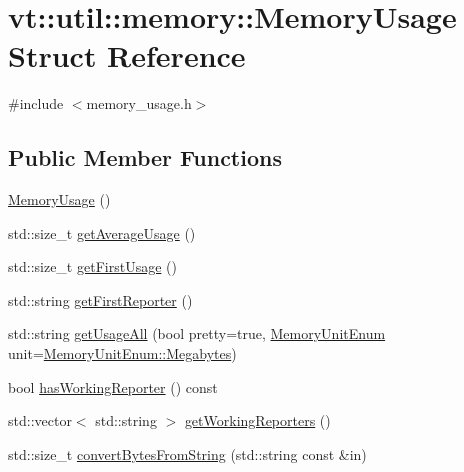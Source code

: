 \hypertarget{structvt_1_1util_1_1memory_1_1_memory_usage}{}\section{vt\+:\+:util\+:\+:memory\+:\+:Memory\+Usage Struct Reference}
\label{structvt_1_1util_1_1memory_1_1_memory_usage}


{\ttfamily \#include $<$memory\+\_\+usage.\+h$>$}

\subsection*{Public Member Functions}
\begin{DoxyCompactItemize}
\item 
\hyperlink{structvt_1_1util_1_1memory_1_1_memory_usage_a5838280c7b2b24ab8ed2aff450b5e98f}{Memory\+Usage} ()
\item 
std\+::size\+\_\+t \hyperlink{structvt_1_1util_1_1memory_1_1_memory_usage_a59d87ec931fe37d4300ba72b00e63d8e}{get\+Average\+Usage} ()
\item 
std\+::size\+\_\+t \hyperlink{structvt_1_1util_1_1memory_1_1_memory_usage_ab02282aab80eb52e5f8f43095af05304}{get\+First\+Usage} ()
\item 
std\+::string \hyperlink{structvt_1_1util_1_1memory_1_1_memory_usage_a5baf0fd6bf753755c4602fcb91a7c268}{get\+First\+Reporter} ()
\item 
std\+::string \hyperlink{structvt_1_1util_1_1memory_1_1_memory_usage_aa37f5b634fb87151fc1688cdba759298}{get\+Usage\+All} (bool pretty=true, \hyperlink{namespacevt_1_1util_1_1memory_a64df3d84293b34009f78e2a1db2f9bb6}{Memory\+Unit\+Enum} unit=\hyperlink{namespacevt_1_1util_1_1memory_a64df3d84293b34009f78e2a1db2f9bb6a2276a1b157f2813f3b65d04c0b1c56f6}{Memory\+Unit\+Enum\+::\+Megabytes})
\item 
bool \hyperlink{structvt_1_1util_1_1memory_1_1_memory_usage_aee12dfad3c08673967dd1fcd6a6adfb5}{has\+Working\+Reporter} () const
\item 
std\+::vector$<$ std\+::string $>$ \hyperlink{structvt_1_1util_1_1memory_1_1_memory_usage_a23bded824e4360e4389d9869c3bd7f18}{get\+Working\+Reporters} ()
\item 
std\+::size\+\_\+t \hyperlink{structvt_1_1util_1_1memory_1_1_memory_usage_ad047c8acc218403b53ec97c82fa7d7e3}{convert\+Bytes\+From\+String} (std\+::string const \&in)
\end{DoxyCompactItemize}
